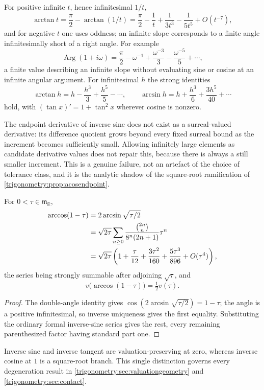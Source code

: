 \documentclass[11pt,letterpaper]{article}
\numberwithin{equation}{section}
\theoremstyle{definition}
\theoremstyle{remark}
\newcommand{\R}{\mathbb R}
\newcommand{\mm}{\mathfrak m}
\newcommand{\Arg}{\operatorname{Arg}}
\begin{document}
For positive infinite $t$, hence infinitesimal $1/t$,
\begin{equation}\label{trigonometry:eq:ataninfty}
 \arctan t=\frac\pi2-\arctan(1/t)
 =\frac\pi2-\frac1t+\frac1{3t^3}-\frac1{5t^5}+O(t^{-7}),
\end{equation}
and for negative $t$ one uses oddness; an infinite slope corresponds to a finite angle
infinitesimally short of a right angle. For example
\[
 \Arg(1+i\omega)=\frac\pi2-\omega^{-1}+\frac{\omega^{-3}}3-\frac{\omega^{-5}}5+\cdots,
\]
a finite value describing an infinite slope without evaluating sine or cosine at an infinite
angular argument. For infinitesimal $h$ the strong identities
\begin{equation}\label{trigonometry:eq:smallseries}
 \arctan h=h-\frac{h^3}3+\frac{h^5}5-\cdots,\qquad
 \arcsin h=h+\frac{h^3}6+\frac{3h^5}{40}+\cdots
\end{equation}
hold, with $(\tan x)'=1+\tan^2x$ wherever cosine is nonzero.

\begin{remark}
\label{trigonometry:rem:noendpointderivative}
The endpoint derivative of inverse sine does not exist as a surreal-valued derivative: its
difference quotient grows beyond every fixed surreal bound as the increment becomes sufficiently
small. Allowing infinitely large elements as candidate derivative values does not repair this,
because there is always a still smaller increment. This is a genuine failure, not an artefact of
the choice of tolerance class, and it is the analytic shadow of the square-root ramification of
\cref{trigonometry:prop:acosendpoint}.
\end{remark}

\begin{proposition}\label{trigonometry:prop:acosendpoint}
For $0<\tau\in\mm_{\R}$,
\begin{align}
 \arccos(1-\tau)&=2\arcsin\sqrt{\tau/2}\label{trigonometry:eq:acosseries}\\
 &=\sqrt{2\tau}\sum_{n\ge0}\frac{\binom{2n}n}{8^n(2n+1)}\tau^n\notag\\
 &=\sqrt{2\tau}\left(1+\frac\tau{12}+\frac{3\tau^2}{160}+\frac{5\tau^3}{896}+O(\tau^4)\right),
 \notag
\end{align}
the series being strongly summable after adjoining $\sqrt\tau$, and
\begin{equation}\label{trigonometry:eq:acosval}
 v\bigl(\arccos(1-\tau)\bigr)=\tfrac12v(\tau).
\end{equation}
\end{proposition}
\begin{proof}
The double-angle identity gives $\cos(2\arcsin\sqrt{\tau/2})=1-\tau$; the angle is a positive
infinitesimal, so inverse uniqueness gives the first equality. Substituting the ordinary formal
inverse-sine series gives the rest, every remaining parenthesized factor having standard part one.
\end{proof}
Inverse sine and inverse tangent are valuation-preserving at zero, whereas inverse cosine at $1$ is
a square-root branch. This single distinction governs every degeneration result in
\cref{trigonometry:sec:valuationgeometry} and \cref{trigonometry:sec:contact}.
\end{document}
